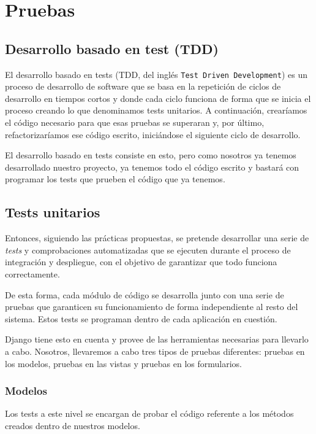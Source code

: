 \chapter{Pruebas}
\label{cap:pruebas}

\section{Desarrollo basado en  test (TDD)}
El desarrollo basado en tests (TDD, del inglés \texttt{Test Driven Development}) es un proceso de desarrollo de software que se basa en la repetición de ciclos de desarrollo en tiempos cortos y donde cada ciclo funciona de forma que se inicia el proceso creando lo que denominamos tests unitarios. A continuación, crearíamos el código necesario para que esas pruebas se superaran y, por último, refactorizaríamos ese código escrito, iniciándose el siguiente ciclo de desarrollo.

El desarrollo basado en tests consiste en esto, pero como nosotros ya tenemos desarrollado nuestro proyecto, ya tenemos todo el código escrito y bastará con programar los tests que prueben el código que ya tenemos.

\section{Tests unitarios}
Entonces, siguiendo las prácticas propuestas, se pretende desarrollar una serie de \textit{tests} y comprobaciones automatizadas que se ejecuten durante el proceso de integración y despliegue, con el objetivo de garantizar que todo funciona correctamente. 

De esta forma, cada módulo de código se desarrolla junto con una serie de pruebas que garanticen su funcionamiento de forma independiente al resto del sistema. Estos tests se programan dentro de cada aplicación en cuestión.

Django tiene esto en cuenta \cite{DjTest} y provee de las herramientas necesarias para llevarlo a cabo. Nosotros, llevaremos a cabo tres tipos de pruebas diferentes: pruebas en los modelos, pruebas en las vistas y pruebas en los formularios.

\subsection{Modelos}

Los tests a este nivel se encargan de probar el código referente a los métodos creados dentro de nuestros modelos.

